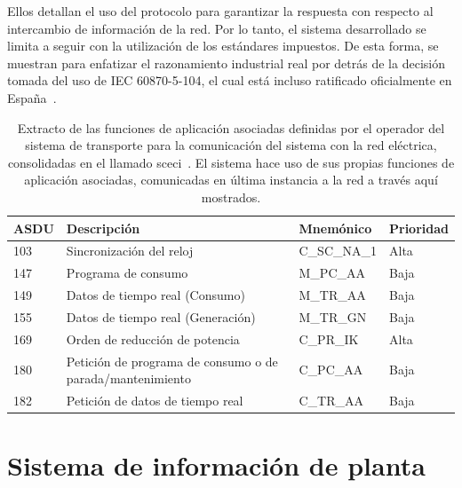 Ellos detallan el uso del protocolo para garantizar la respuesta con respecto al intercambio de información de la red. Por lo tanto, el sistema desarrollado se limita a seguir con la utilización de los estándares impuestos. De esta forma, se muestran para enfatizar el razonamiento industrial real por detrás de la decisión tomada del uso de IEC 60870{-}5{-}104, el cual está incluso ratificado oficialmente en España~\cite{une2017equipos}.

\begin{table}[ht]
  \centering
  \begin{tabular}{|l|p{7.5cm}|l|l|}
    \hline
    ASDU & Descripción                                               & Mnemónico   & Prioridad \\
    \hline
    103  & Sincronización del reloj                                  & C\_SC\_NA\_1 & Alta     \\
    147  & Programa de consumo                                       & M\_PC\_AA    & Baja     \\
    149  & Datos de tiempo real (Consumo)                            & M\_TR\_AA    & Baja     \\
    155  & Datos de tiempo real (Generación)                         & M\_TR\_GN    & Baja     \\
    169  & Orden de reducción de potencia                            & C\_PR\_IK    & Alta     \\
    180  & Petición de programa de consumo o de parada/mantenimiento & C\_PC\_AA    & Baja     \\
    182  & Petición de datos de tiempo real                          & C\_TR\_AA    & Baja     \\
    \hline
  \end{tabular}
  \caption[Funciones de aplicación para la comunicación con la red eléctrica.]{Extracto de las funciones de aplicación asociadas definidas por el operador del sistema de transporte para la comunicación del sistema con la red eléctrica, consolidadas en el llamado \gls{sceci}~\cite{ree2009protocolo}. El sistema hace uso de sus propias funciones de aplicación asociadas, comunicadas en última instancia a la red a través aquí mostrados.}%
  \label{tab:funciones-de-aplicacion-red}
\end{table}

\section{Sistema de información de planta}%
\label{makereference3.4}


